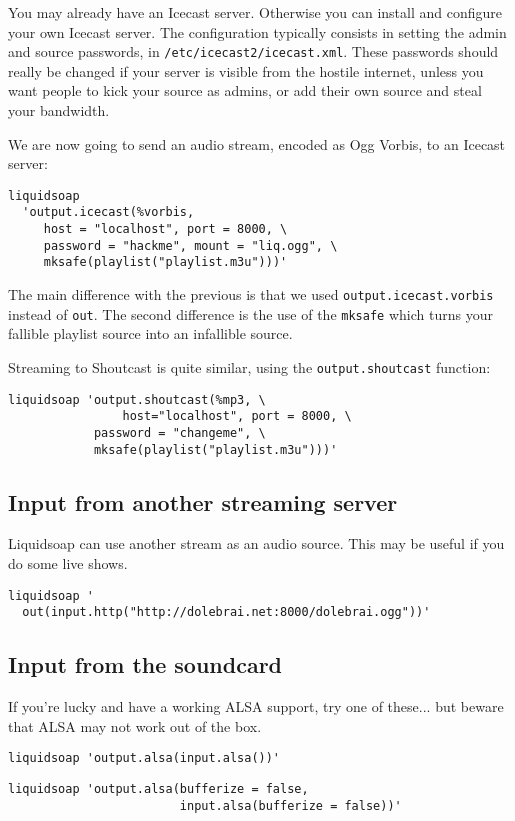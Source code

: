 You may already have an Icecast server. Otherwise you can install and configure
your own Icecast server. The configuration typically consists in setting the
admin and source passwords, in \verb+/etc/icecast2/icecast.xml+. These passwords
should really be changed if your server is visible from the hostile internet,
unless you want people to kick your source as admins, or add their own source
and steal your bandwidth.

We are now going to send an audio stream, encoded as Ogg Vorbis, to an Icecast
server:
\begin{verbatim}
liquidsoap
  'output.icecast(%vorbis,
     host = "localhost", port = 8000, \
     password = "hackme", mount = "liq.ogg", \
     mksafe(playlist("playlist.m3u")))'
\end{verbatim}
The main difference with the previous is that we used
\verb+output.icecast.vorbis+ instead of \verb+out+. The second difference is the
use of the \verb+mksafe+ which turns your fallible playlist source into an
infallible source.

Streaming to Shoutcast is quite similar, using the \verb+output.shoutcast+
function:

\begin{verbatim}
liquidsoap 'output.shoutcast(%mp3, \
                host="localhost", port = 8000, \
	        password = "changeme", \
	        mksafe(playlist("playlist.m3u")))'
\end{verbatim}

\subsection{Input from another streaming server}
Liquidsoap can use another stream as an audio source. This may be useful if you
do some live shows.

\begin{verbatim}
liquidsoap '
  out(input.http("http://dolebrai.net:8000/dolebrai.ogg"))'
\end{verbatim}
\subsection{Input from the soundcard}
If you're lucky and have a working ALSA support, try one of these... but beware
that ALSA may not work out of the box.

\begin{verbatim}
liquidsoap 'output.alsa(input.alsa())'
\end{verbatim}
\begin{verbatim}
liquidsoap 'output.alsa(bufferize = false,
                        input.alsa(bufferize = false))'
\end{verbatim}

